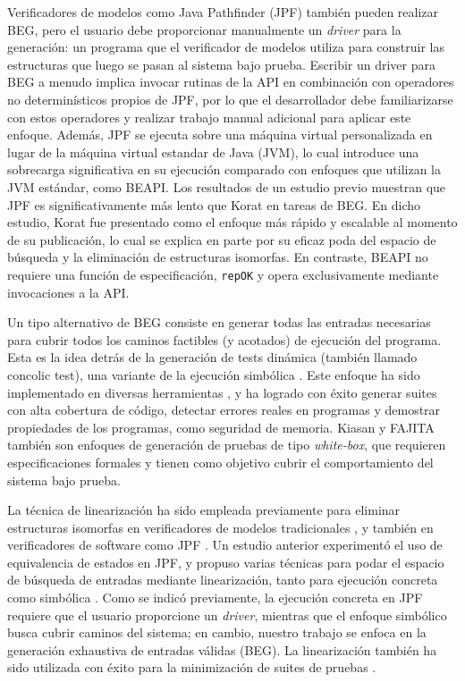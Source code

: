 Verificadores de modelos como \textsf{Java Pathfinder} \cite{Visser05} (\textsf{JPF}) también pueden realizar BEG, pero el usuario debe proporcionar manualmente un 
\emph{driver} para la generación: un programa que el verificador de modelos utiliza para construir las estructuras que luego se pasan al sistema bajo prueba. 
Escribir un driver para BEG a menudo implica invocar rutinas de la API en combinación con operadores no determinísticos propios de \textsf{JPF}, por lo que 
el desarrollador debe familiarizarse con estos operadores y realizar trabajo manual adicional para aplicar este enfoque.
Además, \textsf{JPF} se ejecuta sobre una máquina virtual personalizada en lugar de la máquina virtual estandar de Java (\textsf{JVM}), lo cual introduce una 
sobrecarga significativa en su ejecución comparado con enfoques que utilizan la \textsf{JVM} estándar, como \textsf{BEAPI}. Los resultados de un estudio previo 
\cite{Siddiqui09} muestran que \textsf{JPF} es significativamente más lento que \textsf{Korat} en tareas de BEG. En dicho estudio, \textsf{Korat} fue presentado 
como el enfoque más rápido y escalable al momento de su publicación, lo cual se explica en parte por su eficaz poda del espacio de búsqueda y la eliminación 
de estructuras isomorfas. En contraste, \textsf{BEAPI} no requiere una función de especificación, \texttt{repOK} y opera exclusivamente mediante invocaciones a la API.

Un tipo alternativo de BEG consiste en generar todas las entradas necesarias para cubrir todos los caminos factibles (y acotados) de ejecución del programa.
Esta es la idea detrás de la generación de tests dinámica (también llamado concolic test), una variante de la ejecución 
simbólica \cite{Godefroid18}. Este enfoque ha sido implementado en diversas herramientas \cite{Godefroid12,Godefroid05,Pham19,Christakis15}, y ha logrado 
con éxito generar suites con alta cobertura de código, detectar errores reales en programas y demostrar propiedades de los programas, como seguridad de memoria.
\textsf{Kiasan} \cite{Deng06} y \textsf{FAJITA} \cite{Abad13} también son enfoques de generación de pruebas de tipo \emph{white-box}, que requieren especificaciones 
formales y tienen como objetivo cubrir el comportamiento del sistema bajo prueba.

La técnica de linearización ha sido empleada previamente para eliminar estructuras isomorfas en verificadores de modelos tradicionales \cite{Iosif02,Robby03}, y también 
en verificadores de software como \textsf{JPF} \cite{Visser06}. Un estudio anterior experimentó el uso de equivalencia de estados en \textsf{JPF}, y propuso varias técnicas 
para podar el espacio de búsqueda de entradas mediante linearización, tanto para ejecución concreta como simbólica \cite{Visser06}. 
Como se indicó previamente, la ejecución concreta en \textsf{JPF} requiere que el usuario proporcione un \emph{driver}, 
mientras que el enfoque simbólico busca cubrir caminos del sistema; en cambio, nuestro trabajo se enfoca en la 
generación exhaustiva de entradas válidas (BEG). 
La linearización también ha sido utilizada con éxito para la minimización de suites de pruebas \cite{Xie04}.